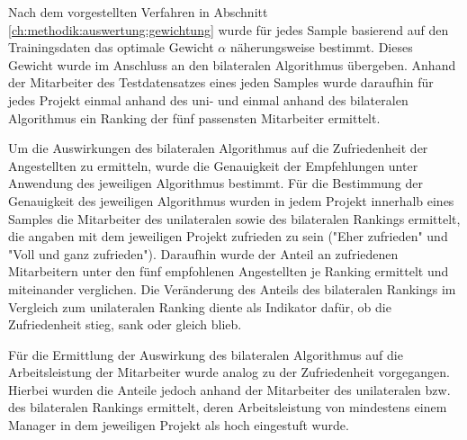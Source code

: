 Nach dem vorgestellten Verfahren in Abschnitt \ref{ch:methodik:auswertung:gewichtung} wurde für jedes Sample basierend auf den Trainingsdaten das optimale Gewicht $\alpha$ näherungsweise bestimmt.
Dieses Gewicht wurde im Anschluss an den bilateralen Algorithmus übergeben.
Anhand der Mitarbeiter des Testdatensatzes eines jeden Samples wurde daraufhin für jedes Projekt einmal anhand des uni- und einmal anhand des bilateralen Algorithmus ein Ranking der fünf passensten Mitarbeiter ermittelt.

Um die Auswirkungen des bilateralen Algorithmus auf die Zufriedenheit der Angestellten zu ermitteln, wurde die Genauigkeit der Empfehlungen unter Anwendung des jeweiligen Algorithmus bestimmt.
Für die Bestimmung der Genauigkeit des jeweiligen Algorithmus wurden in jedem Projekt innerhalb eines Samples die Mitarbeiter des unilateralen sowie des bilateralen Rankings ermittelt, die angaben mit dem jeweiligen Projekt zufrieden zu sein ("Eher zufrieden" und "Voll und ganz zufrieden").
Daraufhin wurde der Anteil an zufriedenen Mitarbeitern unter den fünf empfohlenen Angestellten je Ranking ermittelt und miteinander verglichen.
Die Veränderung des Anteils des bilateralen Rankings im Vergleich zum unilateralen Ranking diente als Indikator dafür, ob die Zufriedenheit stieg, sank oder gleich blieb.

Für die Ermittlung der Auswirkung des bilateralen Algorithmus auf die Arbeitsleistung der Mitarbeiter wurde analog zu der Zufriedenheit vorgegangen.
Hierbei wurden die Anteile jedoch anhand der Mitarbeiter des unilateralen bzw. des bilateralen Rankings ermittelt, deren Arbeitsleistung von mindestens einem Manager in dem jeweiligen Projekt als hoch eingestuft wurde.



